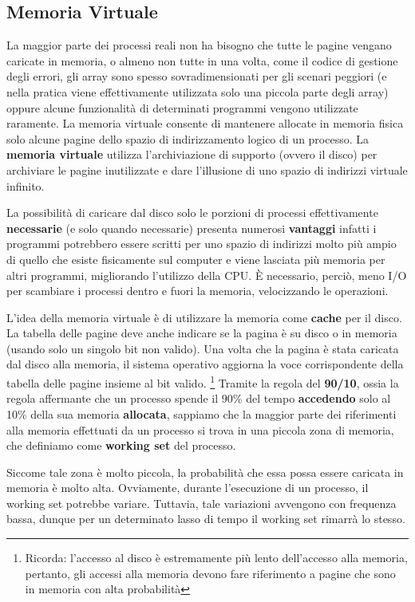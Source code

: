 \documentclass{article}
\begin{document}
\pagebreak
\subsection{Memoria Virtuale}

La maggior parte dei processi reali non ha bisogno che tutte le pagine vengano caricate in memoria, o almeno non tutte in una volta, come il codice di gestione degli errori, gli array sono spesso sovradimensionati per gli scenari peggiori (e nella pratica viene effettivamente utilizzata solo una piccola parte degli array) oppure alcune funzionalità di determinati programmi vengono utilizzate raramente. La memoria virtuale consente di mantenere allocate in memoria fisica solo alcune pagine dello spazio di indirizzamento logico di un processo.
La \textbf{memoria virtuale} utilizza l'archiviazione di supporto (ovvero il disco) per archiviare le pagine inutilizzate e dare l'illusione di uno spazio di indirizzi virtuale infinito.\par
La possibilità di caricare dal disco solo le porzioni di processi effettivamente \textbf{necessarie} (e solo quando necessarie) presenta numerosi \textbf{vantaggi} infatti i programmi potrebbero essere scritti per uno spazio di indirizzi molto più ampio di quello che esiste fisicamente sul computer e viene lasciata più memoria per altri programmi, migliorando l'utilizzo della CPU. È necessario, perciò, meno I/O per scambiare i processi dentro e fuori la memoria, velocizzando le operazioni. \par
L'idea della memoria virtuale è di utilizzare la memoria come \textbf{cache} per il disco. La tabella delle pagine deve anche indicare se la pagina è su disco o in memoria (usando solo un singolo bit non valido). Una volta che la pagina è stata caricata dal disco alla memoria, il sistema operativo aggiorna la voce corrispondente della tabella delle pagine insieme al bit valido. \footnote{Ricorda: l'accesso al disco è estremamente più lento dell'accesso alla memoria, pertanto, gli accessi alla memoria devono fare riferimento a pagine che sono in memoria con alta probabilità}
Tramite la regola del \textbf{90/10}, ossia la regola affermante che un processo spende il 90\% del tempo \textbf{accedendo} solo al 10\% della sua memoria \textbf{allocata}, sappiamo che la maggior parte dei riferimenti alla memoria effettuati da un processo si trova in una piccola zona di memoria, che definiamo come \textbf{working set} del processo.\par
Siccome tale zona è molto piccola, la probabilità che essa possa essere caricata in memoria è molto alta. Ovviamente, durante l'esecuzione di un processo, il working set potrebbe variare. Tuttavia, tale variazioni avvengono con frequenza bassa, dunque per un determinato lasso di tempo il working set rimarrà lo stesso.
\end{document}
